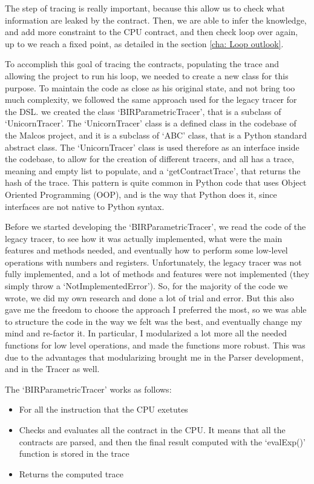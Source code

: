 The step of tracing is really important, because this allow us to check what information
are leaked by the contract. Then, we are able to infer the knowledge, and add
more constraint to the CPU contract, and then check loop over again, up to we
reach a fixed point, as detailed in the section \ref{cha: Loop outlook}.

To accomplish this goal of tracing the contracts, populating the trace and
allowing the project to run his loop, we needed to create a new class for this purpose.
To maintain the code as close as his original state, and not bring too much complexity,
we followed the same approach used for the legacy tracer for the DSL. we created
the class `BIRParametricTracer', that is a subclass of `UnicornTracer'. The `UnicornTracer'
class is a defined class in the codebase of the Malcos project, and it is a
subclass of `ABC' class, that is a Python standard abstract class. The `UnicornTracer'
class is used therefore as an interface inside the codebase, to allow for the creation
of different tracers, and all has a trace, meaning and empty list to populate,
and a `getContractTrace', that returns the hash of the trace. This pattern is
quite common in Python code that uses Object Oriented Programming (OOP), and is the
way that Python does it, since interfaces are not native to Python syntax.

Before we started developing the `BIRParametricTracer', we read the code of the legacy
tracer, to see how it was actually implemented, what were the main features and methods
needed, and eventually how to perform some low-level operations with numbers and
registers. Unfortunately, the legacy tracer was not fully implemented, and a lot
of methods and features were not implemented (they simply throw a `NotImplementedError').
So, for the majority of the code we wrote, we did my own research and done a lot
of trial and error. But this also gave me the freedom to choose the approach I preferred
the most, so we was able to structure the code in the way we felt was the best, and
eventually change my mind and re-factor it. In particular, I modularized a lot more
all the needed functions for low level operations, and made the functions more
robust. This was due to the advantages that modularizing brought me in the Parser
development, and in the Tracer as well.

The `BIRParametricTracer' works as follows:
\begin{itemize}
  \item For all the instruction that the CPU exetutes

  \item Checks and evaluates all the contract in the CPU. It means that all the
    contracts are parsed, and then the final result computed with the `evalExp()'
    function is stored in the trace

  \item Returns the computed trace
\end{itemize}

